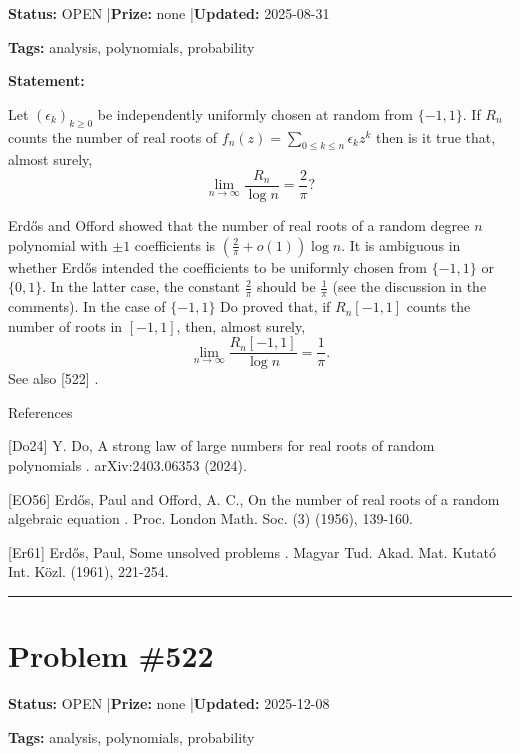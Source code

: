 \documentclass{article}
\begin{document}
\noindent\textbf{Status:} OPEN \quad|\quad \textbf{Prize:} none \quad|\quad \textbf{Updated:} 2025-08-31

\noindent\textbf{Tags:} analysis, polynomials, probability

\medskip

\noindent\textbf{Statement:}

Let $(\epsilon_k)_{k\geq 0}$ be independently uniformly chosen at random from $\{-1,1\}$. If $R_n$ counts the number of real roots of $f_n(z)=\sum_{0\leq k\leq n}\epsilon_k z^k$ then is it true that, almost surely,\[\lim_{n\to \infty}\frac{R_n}{\log n}=\frac{2}{\pi}?\]




Erd\H{o}s and Offord \cite{EO56} showed that the number of real roots of a random degree $n$ polynomial with $\pm 1$ coefficients is $(\frac{2}{\pi}+o(1))\log n$. It is ambiguous in \cite{Er61} whether Erd\H{o}s intended the coefficients to be uniformly chosen from $\{-1,1\}$ or $\{0,1\}$. In the latter case, the constant $\frac{2}{\pi}$ should be $\frac{1}{\pi}$ (see the discussion in the comments). In the case of $\{-1,1\}$ Do \cite{Do24} proved that, if $R_n[-1,1]$ counts the number of roots in $[-1,1]$, then, almost surely,\[\lim_{n\to \infty}\frac{R_n[-1,1]}{\log n}=\frac{1}{\pi}.\]See also [522] .




References

[Do24] Y. Do, A strong law of large numbers for real roots of random polynomials . arXiv:2403.06353 (2024).

[EO56] Erd\H{o}s, Paul and Offord, A. C., On the number of real roots of a random algebraic equation . Proc. London Math. Soc. (3) (1956), 139-160.

[Er61] Erd\H{o}s, Paul, Some unsolved problems . Magyar Tud. Akad. Mat. Kutat\'{o} Int. K\"{o}zl. (1961), 221-254.

\noindent\rule{\linewidth}{0.4pt}


\section{Problem \#522}
\label{prob:522}

\noindent\textbf{Status:} OPEN \quad|\quad \textbf{Prize:} none \quad|\quad \textbf{Updated:} 2025-12-08

\noindent\textbf{Tags:} analysis, polynomials, probability

\medskip
\end{document}
